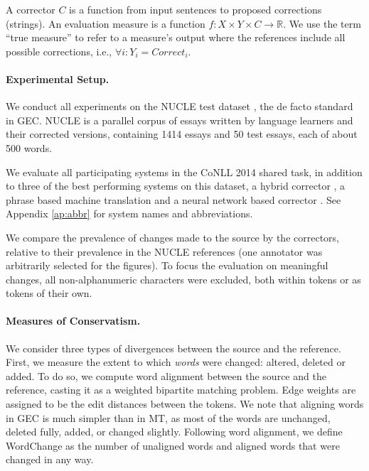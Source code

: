 \documentclass[letterpaper, 11pt]{article}
\newcommand{\lc}[1]{}
\begin{document}
A corrector $C$ is a function from input sentences to proposed corrections (strings).
An evaluation measure is a function $f\colon X \times Y \times C\to \mathbb{R}$. We use the term ``true measure'' to refer to a measure's output where the references include all possible corrections, 
i.e., $\forall i\colon Y_i=Correct_i$.

\paragraph{Experimental Setup.}\label{par:experimental_setup}
We conduct all experiments on the NUCLE test dataset \cite{dahlmeier2013building},
the de facto standard in GEC.
NUCLE is a parallel corpus of essays written by language learners and their corrected versions,
containing 1414 essays and 50 test essays, each of about 500 words.

We evaluate all participating systems in the CoNLL 2014 shared task,
in addition to three of the best performing systems on this dataset,
a hybrid corrector \cite{rozovskaya2016grammatical}, a phrase based machine translation \cite{junczysdowmunt-grundkiewicz:2016:EMNLP2016} 
and a neural network based corrector \cite{xie2016neural}.
See Appendix \ref{ap:abbr} for system names and abbreviations. 

We compare the prevalence of changes made to the source by the correctors,
relative to their prevalence in the NUCLE references (one annotator was arbitrarily 
selected for the figures). 
To focus the evaluation on meaningful changes, all non-alphanumeric characters were 
excluded, both within tokens or as tokens of their own.

\paragraph{Measures of Conservatism.}
We consider three types of divergences between the source and the reference.
First, we measure the extent to which \emph{words} were changed: altered, deleted or added.
To do so, we compute word alignment between the source and the reference, casting it
as a weighted bipartite matching problem. Edge weights are assigned to be the edit distances between the tokens.
We note that aligning words in GEC is much simpler than in MT,
as most of the words are unchanged, deleted fully, added, or changed slightly.
Following word alignment, we define {\sc WordChange}
as the number of unaligned words and aligned words that were changed in any way.
\end{document}
